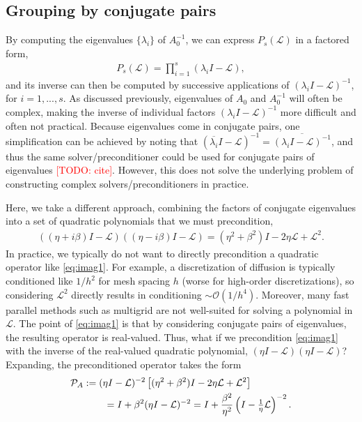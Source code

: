 \documentclass[a4paper,10pt]{article}
\makeatletter
\newcommand{\todo}[1]{\textcolor{red}{[TODO\@: #1]}}
\makeatother
\begin{document}
\subsection{Grouping by conjugate pairs}

By computing the eigenvalues $\{\lambda_i\}$ of $A_0^{-1}$, we can express
$P_s(\mathcal{L})$ in a factored form, 
%
\begin{align}\label{eq:fac}
P_s(\mathcal{L}) = \prod_{i=1}^s (\lambda_i I - \mathcal{L}),
\end{align}
%
and its inverse can then be computed by successive applications of $(\lambda_iI - \mathcal{L})^{-1}$,
for $i=1,...,s$. As discussed previously, eigenvalues of $A_0$ and $A_0^{-1}$ will often be
complex, making the inverse of individual factors $(\lambda_iI - \mathcal{L})^{-1}$ more
difficult and often not practical. Because eigenvalues come in conjugate pairs, one simplification
can be achieved by noting that $(\overline{\lambda_i}I - \mathcal{L})^{-1}
= \overline{(\lambda_iI - \mathcal{L})^{-1}}$, and thus the same solver/preconditioner
could be used for conjugate pairs of eigenvalues \todo{cite}. However, this does not
solve the underlying problem of constructing complex solvers/preconditioners in
practice. 

Here, we take a different approach, combining the factors of conjugate eigenvalues
into a set of quadratic polynomials that we must precondition,
%
\begin{align}\label{eq:imag1}
((\eta + i\beta)I - \mathcal{L})((\eta - i\beta)I - \mathcal{L}) =
	(\eta^2+\beta^2)I - 2\eta \mathcal{L} + \mathcal{L}^2.
\end{align}
%
In practice, we typically do not want to directly precondition a quadratic operator
like \eqref{eq:imag1}. For example, a discretization of diffusion is typically 
conditioned like $1/h^2$ for mesh spacing $h$ (worse for high-order discretizations),
so considering $\mathcal{L}^2$ directly results in conditioning $\sim\mathcal{O}(1/h^4)$.
Moreover, many fast parallel methods such as multigrid are not well-suited for solving
a polynomial in $\mathcal{L}$. The point of \eqref{eq:imag1} is that by considering
conjugate pairs of eigenvalues, the resulting operator is real-valued. Thus, what if
we precondition \eqref{eq:imag1} with the inverse of the real-valued quadratic polynomial,
$(\eta I - \mathcal{L})(\eta I - \mathcal{L})$? Expanding, the preconditioned operator
takes the form
%
\begin{align}\nonumber
\mathcal{P}_A & := (\eta I - \mathcal{L})^{-2}\left[(\eta^2+\beta^2)I - 2\eta \mathcal{L} + \mathcal{L}^2\right] \\
&\hspace{5ex} = I + \beta^2(\eta I - \mathcal{L})^{-2}
= I + \frac{\beta^2}{\eta^2}\left(I - \tfrac{1}{\eta}\mathcal{L}\right)^{-2}.\label{eq:prec1}
\end{align}
%
\end{document}
